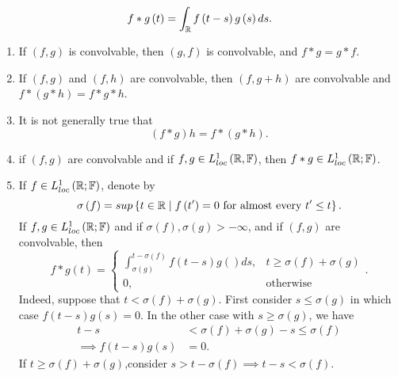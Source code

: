 
\begin{theorem}
\[
	f * g\left( t \right) = \int_{\mathbb{R}}^{ } f \left( t -s \right) g \left( s \right)  d s  
.\] 
\begin{property}
	\begin{enumerate}
		\item If $\left( f, g \right) $ is convolvable, then $\left( g, f \right) $ is convolvable, and $f * g = g * f$. 
		\item If $\left( f, g \right) $ and $\left( f, h \right) $ are convolvable, then $\left( f, g + h \right) $ are convolvable and $f *  \left( g * h \right) =  f * g  * h$.
		\item It is not generally true that 
			\[
				\left( f * g \right) h = f * \left( g * h \right) 
			.\] 
		\item if $\left( f, g \right) $ are convolvable and if $f, g \in  L^{1}_{loc}\left( \mathbb{R}, \mathbb{F} \right) $, then $f * g \in  L^{1}_{loc}\left( \mathbb{R}; \mathbb{F} \right) $. 
		\item If $f \in  L^{1}_{loc}\left( \mathbb{R}; \mathbb{F} \right) $, denote by 
			\[
				\sigma \left( f  \right) = sup \left\{ t \in  \mathbb{R}  \mid f \left( t'  \right) = 0 \text{ for almost every } t' \le t\right\} 
			.\] 
			If $f, g \in L^{1}_{loc}\left( \mathbb{R}; \mathbb{F} \right) $ and if $\sigma \left( f \right) , \sigma \left( g \right) > -\infty$, and if $\left( f, g \right) $ are convolvable, then 
			\[
				f * g\left( t \right) = \begin{cases}
					\int_{\sigma \left( g \right) }^{t - \sigma\left( f \right) } f \left( t - s \right) g\left(  \right)  ds , & t \ge  \sigma \left( f  \right) + \sigma \left( g \right) \\
					0, & \text{otherwise}
				\end{cases}
			.\]
			Indeed, suppose that $t < \sigma \left( f  \right)  + \sigma \left( g \right) $. First consider $s \le  \sigma \left( g \right) $ in which case $f\left( t - s \right) g \left( s \right) = 0$. In the other case with $s \ge \sigma \left( g \right) $, we have 
			\begin{align*}
				t - s &< \sigma \left( f  \right)  + \sigma \left( g \right)  - s \le \sigma \left( f \right) \\
				\implies f \left( t - s  \right) g \left( s \right) &= 0
			.\end{align*}
			If $t \ge  \sigma \left( f \right) + \sigma \left( g \right) $,consider $s > t - \sigma \left( f \right) \implies t - s < \sigma \left( f \right) $. 

\end{enumerate}
\end{property}
\end{theorem}

